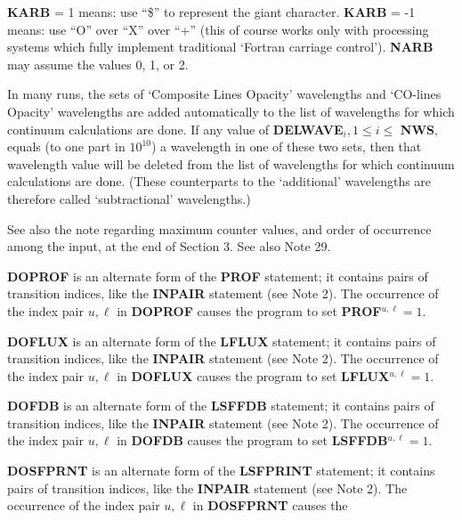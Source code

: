 {\bf KARB} = 1 means: use ``\$'' to represent the giant character. \np
{\bf KARB} = -1 means: use ``O'' over ``X'' over ``+''
(this of course works only with processing systems 
which fully implement traditional `Fortran carriage control'). \np
{\bf NARB} may assume the values 0, 1, or 2.
\blankline
\blankline
\centerline{}
\space \noindent
In many runs, the sets of `Composite Lines Opacity' wavelengths and
`CO-lines Opacity' wavelengths are added automatically to the list of
wavelengths for which continuum calculations are done. If any value of
{\bf DELWAVE}$_i, 1 \leq i \leq $ {\bf NWS}, equals (to one part in $10^{10}$)
a wavelength in one of these two sets, then that wavelength value will be
deleted from the list of wavelengths for which continuum calculations are
done. (These counterparts to the `additional' wavelengths are therefore
called `subtractional' wavelengths.)
\blankline
\blankline
\centerline{}
\space \noindent
See also the note regarding maximum counter values, and order of occurrence
among the input, at the end of Section 3. See also Note 29.
\ej
\centerline{}
\space \noindent
{\bf DOPROF} is an alternate form of the {\bf PROF} statement; it contains
pairs of transition indices, like the {\bf INPAIR} statement (see Note 2).
The occurrence of the index pair $u,\ell$ in {\bf DOPROF} causes the program
to set {\bf PROF}$^{u,\ell} = 1$.
\blankline
\blankline
\centerline{}
\space \noindent
{\bf DOFLUX} is an alternate form of the {\bf LFLUX} statement; it contains
pairs of transition indices, like the {\bf INPAIR} statement (see Note 2).
The occurrence of the index pair $u,\ell$ in {\bf DOFLUX} causes the program
to set {\bf LFLUX}$^{u,\ell} = 1$.
\blankline
\blankline
\centerline{}
\space \noindent
{\bf DOFDB} is an alternate form of the {\bf LSFFDB} statement; it contains
pairs of transition indices, like the {\bf INPAIR} statement (see Note 2).
The occurrence of the index pair $u,\ell$ in {\bf DOFDB} causes the program
to set {\bf LSFFDB}$^{u,\ell} = 1$.
\blankline
\blankline
\centerline{}
\space \noindent
{\bf DOSFPRNT} is an alternate form of the {\bf LSFPRINT} statement; it contains
pairs of transition indices, like the {\bf INPAIR} statement (see Note 2).
The \break occurrence of the index pair $u,\ell$ in {\bf DOSFPRNT} causes the

